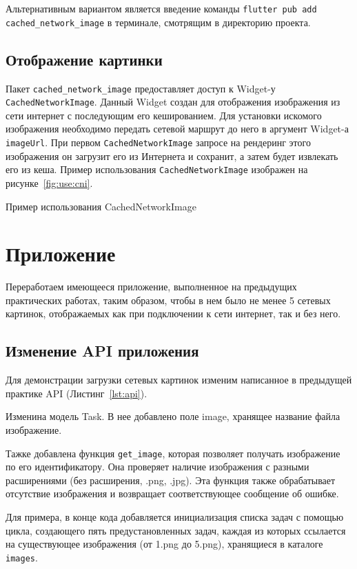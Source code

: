 Альтернативным вариантом является введение команды
\texttt{flutter pub add cached\_network\_image} в терминале,
смотрящим в директорию проекта.

\subsection{Отображение картинки}

Пакет \texttt{cached\_network\_image} предоставляет доступ
к Widget-у \texttt{CachedNetworkImage}.
Данный Widget создан для отображения изображения
из сети интернет с последующим его кешированием.
Для установки искомого изображения необходимо передать сетевой маршрут
до него в аргумент Widget-а \texttt{imageUrl}.
При первом \texttt{CachedNetworkImage} запросе на рендеринг этого изображения
он загрузит его из Интернета и сохранит,
а затем будет извлекать его из кеша.
Пример использования \texttt{CachedNetworkImage}
изображен на рисунке~\ref{fig:use:cni}.

\begin{image}
	\caption{Пример использования CachedNetworkImage}
	\label{fig:use:cni}
\end{image}

\section{Приложение}

Переработаем имеющееся приложение,
выполненное на предыдущих практических работах, таким образом,
чтобы в нем было не менее 5 сетевых картинок,
отображаемых как при подключении к сети интернет, так и без него.

\subsection{Изменение API приложения}

Для демонстрации загрузки сетевых картинок
изменим написанное в предыдущей практике API (Листинг~\ref{lst:api}).\par
Изменина модель Task. В нее добавлено поле image,
хранящее название файла изображение.\par
Тажке добавлена функция \texttt{get\_image},
которая позволяет получать изображение по его идентификатору.
Она проверяет наличие изображения с разными расширениями
(без расширения, .png, .jpg).
Эта функция также обрабатывает отсутствие изображения
и возвращает соответствующее сообщение об ошибке.\par
Для примера, в конце кода добавляется инициализация списка задач
с помощью цикла, создающего пять предустановленных задач,
каждая из которых ссылается на существующее изображения (от 1.png до 5.png),
хранящиеся в каталоге \texttt{images}.

